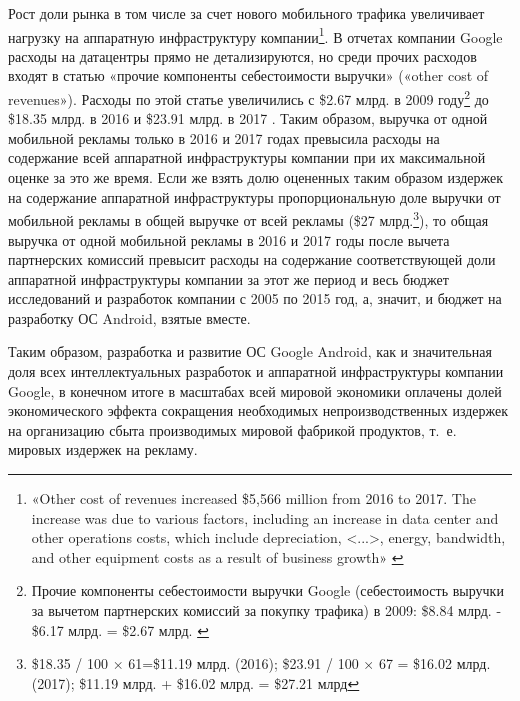 \documentclass{article}
\begin{document}
Рост доли рынка в том числе за счет нового мобильного трафика увеличивает нагрузку на аппаратную инфраструктуру компании\footnote{«Other cost of revenues increased \$5,566 million from 2016 to 2017. The increase was due to various factors, including an increase in data center and other operations costs, which include depreciation, <...>, energy, bandwidth, and other equipment costs as a result of business growth» \cite{google10K2017}}. В отчетах компании Google расходы на датацентры прямо не детализируются, но среди прочих расходов входят в статью «прочие компоненты себестоимости выручки» («other cost of revenues»). Расходы по этой статье увеличились с \$2.67 млрд. в 2009 году\footnote{Прочие компоненты себестоимости выручки Google (себестоимость выручки за вычетом партнерских комиссий за покупку трафика) в 2009: \$8.84 млрд. - \$6.17 млрд. = \$2.67 млрд. \cite{google10K2009}} до \$18.35 млрд. в 2016 и \$23.91 млрд. в 2017 \cite{google10K2017}. Таким образом, выручка от одной мобильной рекламы только в 2016 и 2017 годах превысила расходы на содержание всей аппаратной инфраструктуры компании при их максимальной оценке за это же время. Если же взять долю оцененных таким образом издержек на содержание аппаратной инфраструктуры пропорциональную доле выручки от мобильной рекламы в общей выручке от всей рекламы (\$27 млрд.\footnote{\$18.35 / 100 × 61=\$11.19 млрд. (2016); \$23.91 / 100 × 67 = \$16.02 млрд. (2017); \$11.19 млрд. + \$16.02 млрд. = \$27.21 млрд}), то общая выручка от одной мобильной рекламы в 2016 и 2017 годы после вычета партнерских комиссий превысит расходы на содержание соответствующей доли аппаратной инфраструктуры компании за этот же период и весь бюджет исследований и разработок компании с 2005 по 2015 год, а, значит, и бюджет на разработку ОС Android, взятые вместе.

Таким образом, разработка и развитие ОС Google Android, как и значительная доля всех интеллектуальных разработок и аппаратной инфраструктуры компании Google, в конечном итоге в масштабах всей мировой экономики оплачены долей экономического эффекта сокращения необходимых непроизводственных издержек на организацию сбыта производимых мировой фабрикой продуктов, т.~е. мировых издержек на рекламу.
\end{document}
